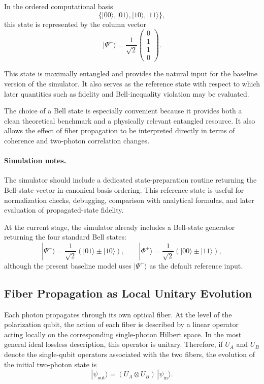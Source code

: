 \documentclass[a4paper]{article}
\begin{document}
In the ordered computational basis
\[
\{|00\rangle, |01\rangle, |10\rangle, |11\rangle\},
\]
this state is represented by the column vector
\[
|\Psi^{+}\rangle
=
\frac{1}{\sqrt{2}}
\begin{pmatrix}
0\\
1\\
1\\
0
\end{pmatrix}.
\]

This state is maximally entangled and provides the natural input for the baseline version of the simulator. It also serves as the reference state with respect to which later quantities such as fidelity and Bell-inequality violation may be evaluated.

The choice of a Bell state is especially convenient because it provides both a clean theoretical benchmark and a physically relevant entangled resource. It also allows the effect of fiber propagation to be interpreted directly in terms of coherence and two-photon correlation changes.

\paragraph{Simulation notes.}
The simulator should include a dedicated state-preparation routine returning the Bell-state vector in canonical basis ordering. This reference state is useful for normalization checks, debugging, comparison with analytical formulas, and later evaluation of propagated-state fidelity.

At the current stage, the simulator already includes a Bell-state generator returning the four standard Bell states:
\[
|\Psi^{\pm}\rangle
=
\frac{1}{\sqrt{2}}\left(|01\rangle \pm |10\rangle\right),
\qquad
|\Phi^{\pm}\rangle
=
\frac{1}{\sqrt{2}}\left(|00\rangle \pm |11\rangle\right),
\]
although the present baseline model uses \( |\Psi^+\rangle \) as the default reference input.


\subsection{Fiber Propagation as Local Unitary Evolution}

Each photon propagates through its own optical fiber. At the level of the polarization qubit, the action of each fiber is described by a linear operator acting locally on the corresponding single-photon Hilbert space. In the most general ideal lossless description, this operator is unitary. Therefore, if \(U_A\) and \(U_B\) denote the single-qubit operators associated with the two fibers, the evolution of the initial two-photon state is
\[
|\psi_{\mathrm{out}}\rangle
=
(U_A \otimes U_B)\, |\psi_{\mathrm{in}}\rangle.
\]
\end{document}

